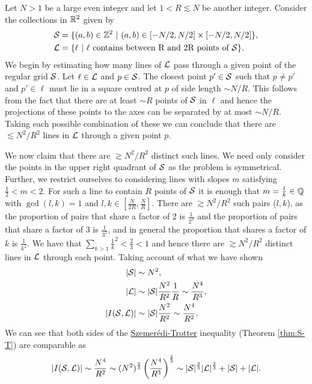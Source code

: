 \begin{example}
    Let $N>1$ be a large even integer and let $1<R \lesssim N$ be another integer. Consider the collections in $\mathbb R^2$ given by
    \begin{align*}
        \mathcal S &= \{ (a,b) \in \mathbb Z^2 \ | \ (a,b) \in [-N/2,N/2] \times [-N/2,N/2] \}, \\
        \mathcal L &= \{ \ell \ | \ \ell \text{ contains between R and 2R points of } \mathcal S \}. \end{align*}
    We begin by estimating how many lines of $\mathcal L$ pass through a given point of the regular grid $\mathcal S$.
    Let $\ell \in \mathcal L$ and $p \in \mathcal S$. The closest point $p' \in \mathcal S$ such that $p \neq p'$ and $p' \in \ell$ must lie
    in a square centred at $p$ of side length $\sim N/R$. This follows from the fact that there are at least $\sim R$ points of $\mathcal S$ in $\ell$ and hence the
    projections of these points to the axes can be separated by at most $\sim N/R$. Taking each possible combination of these we can conclude that there are $\lesssim N^2 / R^2$ lines in $\mathcal L$ through a
    given point $p$.

    We now claim that there are $\gtrsim N^2 / R^2$ distinct such lines. We need only consider the points in the upper right quadrant of $\mathcal S$ as the problem is symmetrical.
    Further, we restrict ourselves to considering lines with slopes $m$ satisfying $\frac{1}{2} < m < 2$. For such a line to contain $R$  points
    of $\mathcal S$ it is enough that $m= \frac{l}{k} \in \mathbb Q$ with $\gcd(l,k) =1$ and $l,k \in \left[\frac{N}{2R}, \frac{N}{R} \right]$. There are $\gtrsim N^2/R^2$ such pairs ($l,k$), as the proportion of pairs that share a factor of 2 is $\frac{1}{2^2}$ and the proportion of pairs that share a factor 
    of 3 is $\frac{1}{3^2}$, and in general the proportion that shares a factor of $k$ is $\frac{1}{k^2}$. We have that $\sum_{k>1} \frac{1}{k}^2 < \frac{2}{3} < 1$ and hence there are $\gtrsim N^2 /R^2$ distinct
    lines in $\mathcal L$ through each point. Taking account of what we have shown
    \begin{align*}
        |\mathcal S| &\sim N^2, \\ 
        |\mathcal L| &\sim |\mathcal S| \frac{N^2}{R^2} \frac{1}{R} \sim \frac{N^4}{R^3},\\
        |I(\mathcal S, \mathcal L)| &\sim |\mathcal S| \frac{N^2}{R^2} \sim \frac{N^4}{R^2}.\\
    \end{align*}
    We can see that both sides of the \hyperref[thm:S-T]{Szemerédi-Trotter} inequality (Theorem \ref{thm:S-T}) are comparable as
    \[
    |I(\mathcal S, \mathcal L)| \sim \frac{N^4}{R^2} \sim (N^2)^{\frac{2}{3}} \left(\frac{N^4}{R^3}\right)^{\frac{2}{3}} \sim |\mathcal S|^{\frac{2}{3}}|\mathcal L|^{\frac{2}{3}} + |\mathcal S| + |\mathcal L|.
    \]
\end{example}




